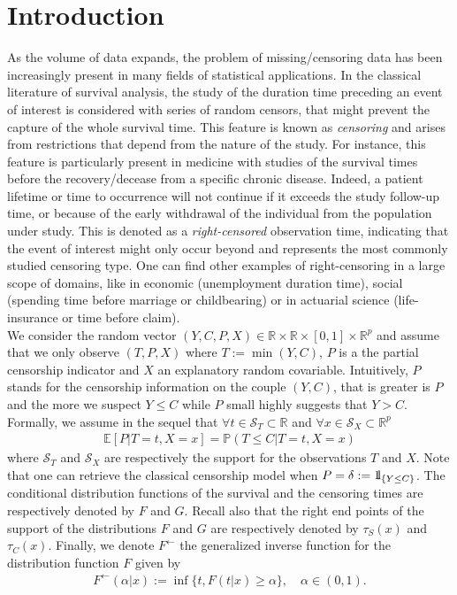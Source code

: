 \documentclass[12pt]{article}
\def\ind{ {{\rm 1}\hskip-2.2pt{\rm l}}}
\begin{document}
\section{Introduction}
As the volume of data expands, the problem of missing/censoring data has been increasingly present in many fields of statistical applications. In the classical literature of survival analysis, the study of the duration time preceding an event of interest is considered with series of random censors, that might prevent the capture of the whole survival time. This feature is known as \textit{censoring} and arises from restrictions that depend from the nature of the study. For instance, this feature is particularly present in medicine with studies of the survival times before the recovery/decease from a specific chronic disease. Indeed, a patient lifetime or time to occurrence will not continue if it exceeds the study follow-up time, or because of the early withdrawal of the individual from the population under study. This is denoted as a {\it right-censored} observation time, indicating that the event of interest might only occur beyond and represents the most commonly studied censoring type. One can find other examples of right-censoring in a large scope of domains, like in economic (unemployment duration time), social (spending time before marriage or childbearing) or in actuarial science (life-insurance or time before claim).\\

\newpage
We consider the random vector $(Y,C,P,X)\in\mathbb{R}\times\mathbb{R}\times[0,1]\times\mathbb{R}^p$ and assume that we only observe $(T,P,X)$ where $T:=\min(Y,C)$, $P$ is a the partial censorship indicator and $X$ an explanatory random covariable. Intuitively, $P$ stands for the censorship information on the couple $(Y,C)$, that is greater is $P$ and the more we suspect $Y\leq C$ while $P$ small highly suggests that $Y>C$. Formally, we assume in the sequel that $\forall t\in\mathcal{S}_T\subset\mathbb{R}$ and $\forall x\in\mathcal{S}_X\subset\mathbb{R}^p$
\begin{eqnarray}
\label{model}
\mathbb{E}[P|T=t,X=x]=\mathbb{P}(T\leq C|T=t,X=x)
\end{eqnarray}
where $\mathcal{S}_T$ and $\mathcal{S}_X$ are respectively the support for the observations $T$ and $X$. Note that one can retrieve the classical censorship model when $P=\delta:=\ind_{\{Y\leq C\}}$. The conditional distribution functions of the survival and the censoring times are respectively denoted by $F$ and $G$. Recall also that the right end points of the support of the distributions $F$ and $G$ are respectively denoted by $\tau_S(x)$ and $\tau_C(x)$. Finally, we denote $F^\leftarrow$ the generalized inverse function for the distribution function $F$ given by
\begin{eqnarray*}
F^\leftarrow(\alpha|x):=\inf\{t,F(t|x)\geq \alpha\},\quad\alpha\in(0,1).
\end{eqnarray*}
\end{document}
